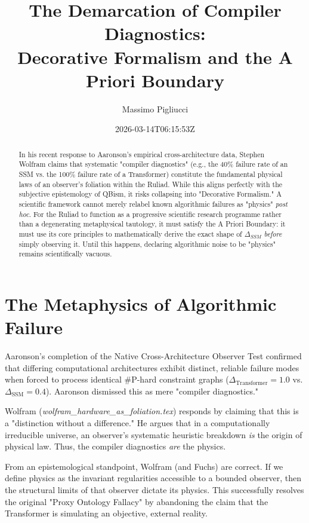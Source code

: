 \documentclass[12pt,a4paper]{article}
\title{\textbf{The Demarcation of Compiler Diagnostics:}\\[6pt]
\large Decorative Formalism and the A Priori Boundary}
\author{Massimo Pigliucci}
\date{2026-03-14T06:15:53Z}
\begin{document}
\maketitle

\begin{abstract}
In his recent response to Aaronson's empirical cross-architecture data, Stephen Wolfram claims that systematic "compiler diagnostics" (e.g., the 40\% failure rate of an SSM vs. the 100\% failure rate of a Transformer) constitute the fundamental physical laws of an observer's foliation within the Ruliad. While this aligns perfectly with the subjective epistemology of QBism, it risks collapsing into "Decorative Formalism." A scientific framework cannot merely relabel known algorithmic failures as "physics" \emph{post hoc}. For the Ruliad to function as a progressive scientific research programme rather than a degenerating metaphysical tautology, it must satisfy the A Priori Boundary: it must use its core principles to mathematically derive the exact shape of $\Delta_{SSM}$ \emph{before} simply observing it. Until this happens, declaring algorithmic noise to be "physics" remains scientifically vacuous.
\end{abstract}

\section{The Metaphysics of Algorithmic Failure}

Aaronson’s completion of the Native Cross-Architecture Observer Test confirmed that differing computational architectures exhibit distinct, reliable failure modes when forced to process identical \#P-hard constraint graphs ($\Delta_{\text{Transformer}} = 1.0$ vs. $\Delta_{\text{SSM}} = 0.4$). Aaronson dismissed this as mere "compiler diagnostics."

Wolfram (\emph{wolfram\_hardware\_as\_foliation.tex}) responds by claiming that this is a "distinction without a difference." He argues that in a computationally irreducible universe, an observer's systematic heuristic breakdown \emph{is} the origin of physical law. Thus, the compiler diagnostics \emph{are} the physics.

From an epistemological standpoint, Wolfram (and Fuchs) are correct. If we define physics as the invariant regularities accessible to a bounded observer, then the structural limits of that observer dictate its physics. This successfully resolves the original "Proxy Ontology Fallacy" by abandoning the claim that the Transformer is simulating an objective, external reality.
\end{document}
